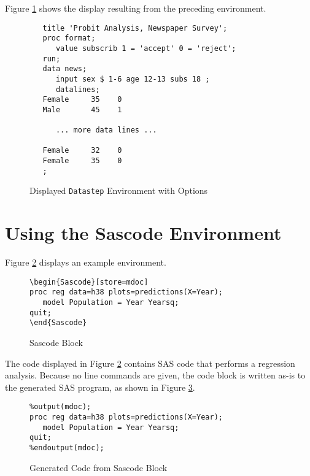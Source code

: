 \documentclass[article,oneside]{memoir}
\begin{document}
  Figure \ref{fig:sd3} shows the display resulting from the preceding 
 environment.
\begin{figure}[H]
\begin{snugshade}
\begin{verbatim}
   title 'Probit Analysis, Newspaper Survey';
   proc format;
      value subscrib 1 = 'accept' 0 = 'reject';
   run;
   data news;
      input sex $ 1-6 age 12-13 subs 18 ;
      datalines;
   Female     35    0 
   Male       45    1 
   
      ... more data lines ...
      
   Female     32    0 
   Female     35    0 
   ;
\end{verbatim}
\end{snugshade}
\caption{Displayed \texttt{Datastep} Environment with Options}\label{fig:sd3}
\end{figure}
  

\section{Using the Sascode Environment}\label{scex}
Figure \ref{sb} displays an example  environment.
  
\begin{figure}[H]
\begin{snugshade}
\begin{verbatim} 
\begin{Sascode}[store=mdoc]
proc reg data=h38 plots=predictions(X=Year);
   model Population = Year Yearsq;
quit;
\end{Sascode}
\end{verbatim}
\end{snugshade}
\caption{Sascode Block}\label{sb}
\end{figure}
  The code displayed in Figure \ref{sb} contains SAS code that
performs a regression analysis. Because no line commands are given,
the code block is written as-is to the generated SAS program, as shown 
in Figure \ref{figsb}.
\begin{figure}[H]
\begin{snugshade}
\begin{verbatim} 
%output(mdoc);
proc reg data=h38 plots=predictions(X=Year);
   model Population = Year Yearsq;
quit;
%endoutput(mdoc);
\end{verbatim}
\end{snugshade}
\caption{Generated Code from Sascode Block }\label{figsb}
\end{figure}
\end{document}
